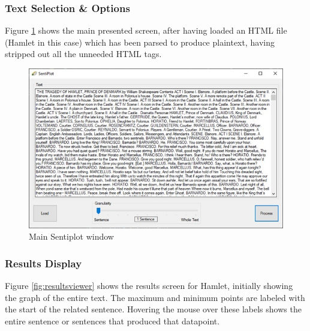 \documentclass{article}
\begin{document}
    \subsubsection{Text Selection \& Options}
    Figure \ref{fig:sentiplot} shows the main presented screen, after having loaded an HTML file (Hamlet in this case) which has been parsed to produce plaintext, having stripped out all the unneeded HTML tags.
        \begin{figure}[H]
            \includegraphics[width=1\textwidth]{Misc/sentiplot}
            \caption{Main Sentiplot window}
            \label{fig:sentiplot}
        \end{figure}
    \subsubsection{Results Display}
        Figure \ref{fig:resultsviewer} shows the results screen for Hamlet, initially showing the graph of the entire text. The maximum and minimum points are labeled with the start of the related sentence. Hovering the mouse over these labels shows the entire sentence or sentences that produced that datapoint.
\end{document}
